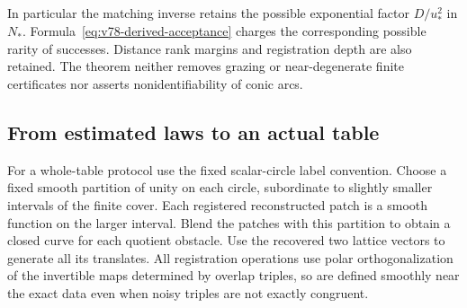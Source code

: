 In particular the matching inverse retains the possible exponential
factor $D/u_*^2$ in $N_*$.  Formula~\eqref{eq:v78-derived-acceptance}
charges the corresponding possible rarity of successes.  Distance rank
margins and registration depth are also retained.  The theorem neither
removes grazing or near-degenerate finite certificates nor asserts
nonidentifiability of conic arcs.

\subsection{From estimated laws to an actual table}
For a whole-table protocol use the fixed scalar-circle label convention.
Choose a fixed smooth partition of unity on each circle, subordinate
to slightly smaller intervals of the finite cover.  Each registered
reconstructed patch is a smooth function on the larger interval.
Blend the patches with this partition to obtain a closed curve for each
quotient obstacle.  Use the recovered two lattice vectors to generate
all its translates.  All registration operations use polar
orthogonalization of the invertible maps determined by overlap triples,
so are defined smoothly near the exact data even when noisy triples
are not exactly congruent.

